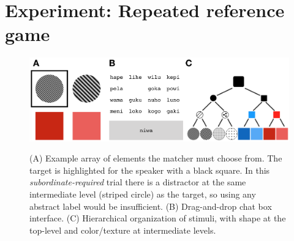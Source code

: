 \documentclass[10pt,letterpaper]{article}
\begin{document}



			
\section{Experiment: Repeated reference game}

\begin{figure}[t]
\begin{center}
{\includegraphics[scale=.65]{fig.png}}
{\caption{{(A) Example array of elements the matcher must choose from. The target is highlighted for the speaker with a black square. In this \emph{subordinate-required} trial there is a distractor at the same intermediate level (striped circle) as the target, so using any abstract label would be insufficient. (B) Drag-and-drop chat box interface. (C) Hierarchical organization of stimuli, with shape at the top-level and color/texture at intermediate levels.  \label{exp}}}}
\end{center}
\end{figure}
\end{document}
